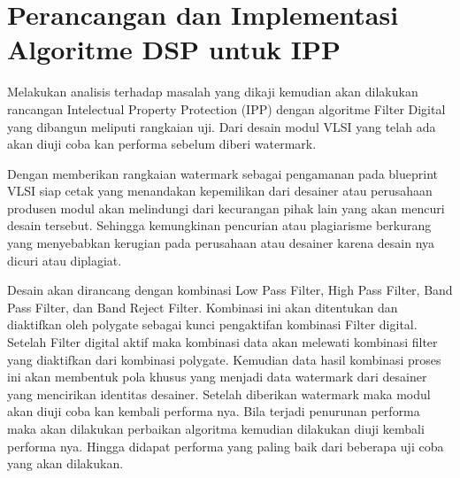 \section{Perancangan dan Implementasi Algoritme DSP untuk IPP}

Melakukan analisis terhadap masalah yang dikaji kemudian akan
dilakukan rancangan Intelectual Property Protection (IPP) dengan algoritme Filter
Digital yang dibangun meliputi rangkaian uji. Dari desain modul VLSI yang telah
ada akan diuji coba kan performa sebelum diberi watermark.

Dengan memberikan rangkaian watermark sebagai pengamanan pada
blueprint VLSI siap cetak yang menandakan kepemilikan dari desainer atau
perusahaan produsen modul akan melindungi dari kecurangan pihak lain yang
akan mencuri desain tersebut. Sehingga kemungkinan pencurian atau plagiarisme
berkurang yang menyebabkan kerugian pada perusahaan atau desainer karena
desain nya dicuri atau diplagiat.

Desain akan dirancang dengan kombinasi Low Pass Filter, High Pass
Filter, Band Pass Filter, dan Band Reject Filter. Kombinasi ini akan ditentukan
dan diaktifkan oleh polygate sebagai kunci pengaktifan kombinasi Filter digital.
Setelah Filter digital aktif maka kombinasi data akan melewati kombinasi filter
yang diaktifkan dari kombinasi polygate. Kemudian data hasil kombinasi proses
ini akan membentuk pola khusus yang menjadi data watermark dari desainer yang
mencirikan identitas desainer. Setelah diberikan watermark maka modul akan
diuji coba kan kembali performa nya. Bila terjadi penurunan performa maka akan
dilakukan perbaikan algoritma kemudian dilakukan diuji kembali performa nya.
Hingga didapat performa yang paling baik dari beberapa uji coba yang akan
dilakukan.

